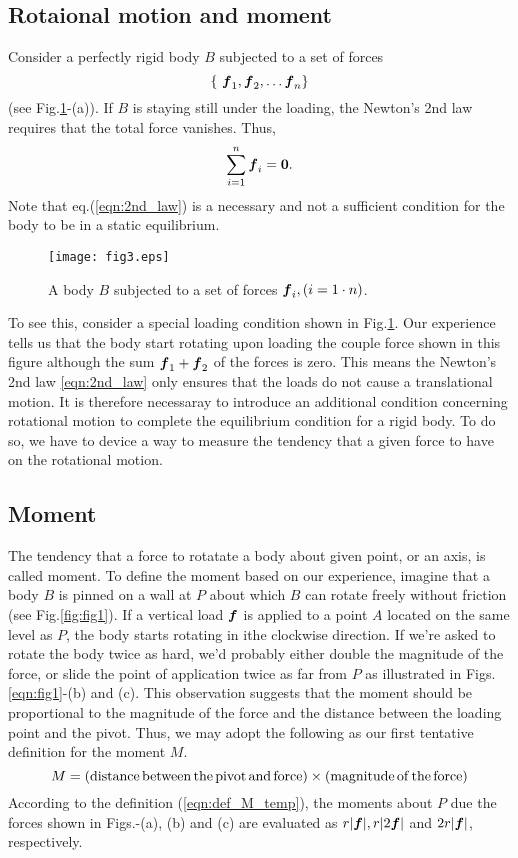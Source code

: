\documentclass[10pt,a4j]{article}
\begin{document}
\subsection{Rotaional motion and moment}
Consider a perfectly rigid body $B$ subjected to a set of forces
\[ 
	\left\{\ \fat{f}_1, \fat{f}_2, \dots \fat{f}_{n} \right\}
\]
(see Fig.\ref{fig:fig3}-(a)).
If $B$ is staying still under the loading, the Newton's 2nd law requires that 
the total force vanishes. Thus,
\begin{equation}
	\sum_{i=1}^n \mbox{\boldmath $f$}_i = \mbox{\boldmath $0$}.
	\label{eqn:2nd_law}
\end{equation}
Note that eq.(\ref{eqn:2nd_law}) is a necessary and not a sufficient condition 
for the body to be in a static equilibrium. 
\begin{figure}[h]
	\begin{center}
	\texttt{[image: fig3.eps]} 
	\end{center}
	\caption{A body $B$ subjected to a set of forces $\mbox{\boldmath $f$}_i,(i=1\cdot n)$.} 
	\label{fig:fig3}
\end{figure}
To see this, consider a special loading condition shown in Fig.\ref{fig:fig3}. 
Our experience tells us that the body start rotating upon loading the couple force 
 shown in this figure although the sum $\mbox{\boldmath $f$}_1+\mbox{\boldmath $f$}_2$ of the forces is zero.
This means the Newton's 2nd law \ref{eqn:2nd_law} only ensures that the loads
do not cause a translational motion. 
It is therefore necessaray to introduce an additional condition concerning rotational 
motion to complete the equilibrium condition for a rigid body. 
To do so, we have to device a way to measure the tendency that a given force to have on 
the rotational motion. 
\subsection{Moment}
The tendency that a force to rotatate a body about given point, or an axis,
is called moment. To define the moment based on our experience, imagine that 
a body $B$ is pinned on a wall at $P$ about which $B$ can rotate freely without 
friction (see Fig.\ref{fig:fig1}). If a vertical load $\mbox{\boldmath $f$}$ is applied to a point $A$ 
located on the same level as $P$, the body starts rotating in ithe clockwise direction.
If we're asked to rotate the body twice as hard, we'd probably either 
double the magnitude of the force, or slide the point of application twice as far from $P$ 
as illustrated in Figs.\ref{eqn:fig1}-(b) and (c).
This observation suggests that the moment should be proportional to the magnitude of the 
force and the distance between the loading point and the pivot.  
Thus, we may adopt the following as our first tentative definition for the moment $M$. 
\begin{equation}
	M=({\rm distance \, between \,the \, pivot\, and\, force) \times (magnitude \, of \, the \,force)}
	\label{eqn:def_M_temp}
\end{equation}
According to the definition (\ref{eqn:def_M_temp}), the moments about $P$ due the 
forces shown in Figs.-(a), (b) and (c) are evaluated as $r|\mbox{\boldmath $f$}|, r|2\mbox{\boldmath $f$}|$ and $2r|\mbox{\boldmath $f$}|$, respectively.
\end{document}
